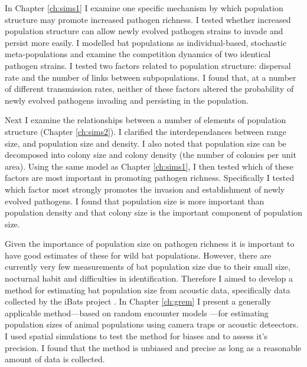 
In Chapter \ref{ch:sims1} I examine one specific mechanism by which population structure may promote increased pathogen richness.
I tested whether increased population structure can allow newly evolved pathogen strains to invade and persist more easily.
I modelled bat populations as individual-based, stochastic meta-populations and examine the competition dynamics of two identical pathogen strains.
I tested two factors related to population structure: dispersal rate and the number of links between subpopulations.
I found that, at a number of different transmission rates, neither of these factors altered the probability of newly evolved pathogens invading and persisting in the population.


Next I examine the relationships between a number of elements of population structure (Chapter \ref{ch:sims2}).
I clarified the interdependances between range size, and population size and density.
I also noted that population size can be decomposed into colony size and colony density (the number of colonies per unit area).
Using the same model as Chapter \ref{ch:sims1}, I then tested which of these factors are most important in promoting pathogen richness.
Specifically I tested which factor most strongly promotes the invasion and establishment of newly evolved pathogens.
I found that population size is more important than population density and that colony size is the important component of population size.


Given the importance of population size on pathogen richness it is important to have good estimates of these for wild bat populations.
However, there are currently very few measurements of bat population size due to their small size, nocturnal habit and difficulties in identification.
Therefore I aimed to develop a method for estimating bat population size from acoustic data, specifically data collected by the iBats project \cite{jones2011indicator}.
In Chapter \ref{ch:grem} I present a generally applicable method---based on random encounter models \cite{rowcliffe2008estimating, yapp1956theory}---for estimating population sizes of animal populations using camera traps or acoustic deteectors.
I used spatial simulations to test the method for biases and to assess it's precision.
I found that the method is unbiased and precise as long as a reasonable amount of data is collected.














